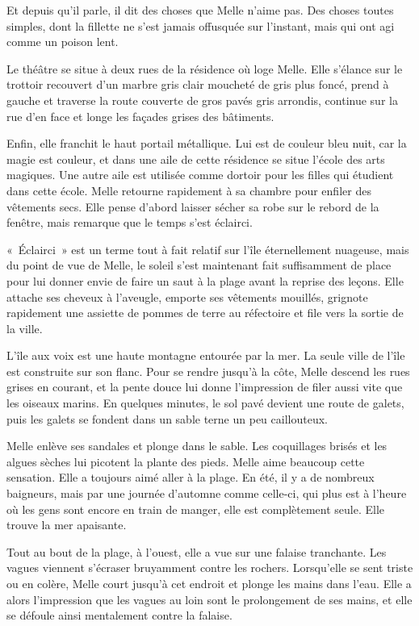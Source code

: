 Et depuis qu'il parle, il dit des choses que Melle n'aime pas. Des choses toutes simples, dont la fillette ne s'est jamais offusquée sur l'instant, mais qui ont agi comme un poison lent.

\parbr

Le théâtre se situe à deux rues de la résidence où loge Melle. Elle s'élance sur le trottoir recouvert d'un marbre gris clair moucheté de gris plus foncé, prend à gauche et traverse la route couverte de gros pavés gris arrondis, continue sur la rue d'en face et longe les façades grises des bâtiments.

Enfin, elle franchit le haut portail métallique. Lui est de couleur bleu nuit, car la magie est couleur, et dans une aile de cette résidence se situe l'école des arts magiques. Une autre aile est utilisée comme dortoir pour les filles qui étudient dans cette école. Melle retourne rapidement à sa chambre pour enfiler des vêtements secs. Elle pense d'abord laisser sécher sa robe sur le rebord de la fenêtre, mais remarque que le temps s'est éclairci.

«~Éclairci~» est un terme tout à fait relatif sur l'île éternellement nuageuse, mais du point de vue de Melle, le soleil s'est maintenant fait suffisamment de place pour lui donner envie de faire un saut à la plage avant la reprise des leçons. Elle attache ses cheveux à l'aveugle, emporte ses vêtements mouillés, grignote rapidement une assiette de pommes de terre au réfectoire et file vers la sortie de la ville.

L'île aux voix est une haute montagne entourée par la mer. La seule ville de l'île est construite sur son flanc. Pour se rendre jusqu'à la côte, Melle descend les rues grises en courant, et la pente douce lui donne l'impression de filer aussi vite que les oiseaux marins. En quelques minutes, le sol pavé devient une route de galets, puis les galets se fondent dans un sable terne un peu caillouteux.

Melle enlève ses sandales et plonge dans le sable. Les coquillages brisés et les algues sèches lui picotent la plante des pieds. Melle aime beaucoup cette sensation. Elle a toujours aimé aller à la plage. En été, il y a de nombreux baigneurs, mais par une journée d'automne comme celle-ci, qui plus est à l'heure où les gens sont encore en train de manger, elle est complètement seule. Elle trouve la mer apaisante.

Tout au bout de la plage, à l'ouest, elle a vue sur une falaise tranchante. Les vagues viennent s'écraser bruyamment contre les rochers. Lorsqu'elle se sent triste ou en colère, Melle court jusqu'à cet endroit et plonge les mains dans l'eau. Elle a alors l'impression que les vagues au loin sont le prolongement de ses mains, et elle se défoule ainsi mentalement contre la falaise.

